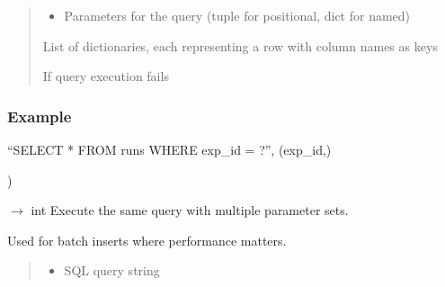 \documentclass[letterpaper,10pt,english]{sphinxmanual}
\begin{document}
\begin{fulllineitems}
\begin{fulllineitems}
\begin{quote}
\begin{description}
\begin{itemize}
\item {} 
\sphinxAtStartPar
{} \textendash{} Parameters for the query (tuple for positional, dict for named)

\end{itemize}

\sphinxAtStartPar
List of dictionaries, each representing a row with column names as keys

\sphinxAtStartPar
{\hyperref[\detokenize{core.database.base:core.database.base.DatabaseError}]{}} \textendash{} If query execution fails

\end{description}\end{quote}
\subsubsection*{Example}
\begin{description}
\sphinxAtStartPar
“SELECT * FROM runs WHERE exp\_id = ?”,
(exp\_id,)

\end{description}

\sphinxAtStartPar
)

\end{fulllineitems}


\begin{fulllineitems}
\label{\detokenize{core.database.base:core.database.base.DatabaseInterface.execute_many}}
\pysigstartsignatures
\pysiglinewithargsret
{}
{\sphinxparamcomma {}}
{{ $\rightarrow$ int}}
\pysigstopsignatures
\sphinxAtStartPar
Execute the same query with multiple parameter sets.

\sphinxAtStartPar
Used for batch inserts where performance matters.
\begin{quote}\begin{description}
\begin{itemize}
\item {} 
\sphinxAtStartPar
{} \textendash{} SQL query string


\end{itemize}
\end{description}
\end{quote}
\end{fulllineitems}
\end{fulllineitems}
\end{document}
